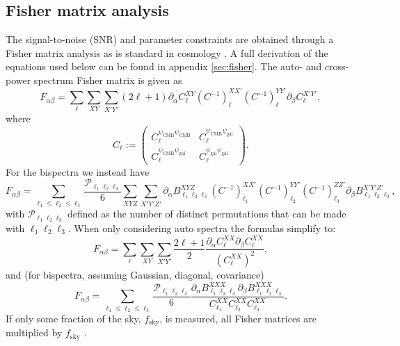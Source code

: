\documentclass[11pt]{article} %
\begin{document}
\subsection{Fisher matrix analysis}
The signal-to-noise (SNR) and parameter constraints are obtained through a Fisher matrix analysis as is standard in cosmology \cite{dodelson2020modern, Knox1995, Tegmark1997}. A full derivation of the equations used below can be found in appendix \ref{sec:fisher}. The auto- and cross- power spectrum Fisher matrix is given as
\begin{equation*}
    F_{\alpha\beta} = \sum_{\ell} \sum_{XY}\sum_{X'Y'}(2\ell+1)\partial_\alpha C_\ell^{XY} (C^{-1})_\ell^{XX'}(C^{-1})_\ell^{YY'} \partial_\beta C^{X'Y'}_\ell,
\end{equation*}
where
\begin{equation*}
    C_{\ell} := \begin{pmatrix}
        C^{\psi_{\text{CMB}}\psi_{\text{CMB}}}_\ell & C^{\psi_{\text{CMB}}\psi_{\text{gal}}}_\ell \\
        C^{\psi_{\text{CMB}}\psi_{\text{gal}}}_\ell & C^{\psi_{\text{gal}}\psi_{\text{gal}}}_\ell
    \end{pmatrix}.
\end{equation*}
For the bispectra we instead have 
\begin{equation*}
    F_{\alpha\beta} = \sum_{\ell_1 \leq \ell_2 \leq \ell_3} \frac{\mathcal P _{\ell_1\ell_2\ell_3}}{6}
    \sum_{XYZ}\sum_{X'Y'Z'} 
    \partial_\alpha B^{X Y Z}_{\ell_1 \ell_2 \ell_3} 
    (C^{-1})^{X X'}_{\ell_1}
    (C^{-1})^{Y Y'}_{\ell_2}
    (C^{-1})^{Z Z'}_{\ell_3}
    \partial_\beta B^{X' Y' Z'}_{\ell_1 \ell_2 \ell_3},
\end{equation*}
with $\mathcal P_{\ell_1\ell_2\ell_3}$ defined as the number of distinct permutations that can be made with $\ell_1\ell_2\ell_3$. When only considering auto spectra the formulas simplify to:
\begin{equation*}
    F_{\alpha\beta} = \sum_{\ell} \sum_{XY}\sum_{X'Y'}\frac{2\ell+1}{2}\frac{\partial_{\alpha}C_\ell^{XX} \partial_\beta C^{XX}_\ell}{(C_\ell^{XX})^2},
\end{equation*}
and (for bispectra, assuming Gaussian, diagonal, covariance)
\begin{equation*}
    F_{\alpha\beta} = \sum_{\ell_1 \leq \ell_2 \leq \ell_3} \frac{\mathcal P _{\ell_1\ell_2\ell_3}}{6}
    \frac{\partial_\alpha B^{X X X}_{\ell_1 \ell_2 \ell_3} 
    \partial_\beta B^{XXX}_{\ell_1 \ell_2 \ell_3}}{C^{XX}_{\ell_1}C^{XX}_{\ell_2}C^{XX}_{\ell_3}}.
\end{equation*}
If only some fraction of the sky, $f_{\text{sky}}$, is measured, all Fisher matrices are multiplied by $f_{\text{sky}}$ \cite{Takada2003}.
\end{document}
